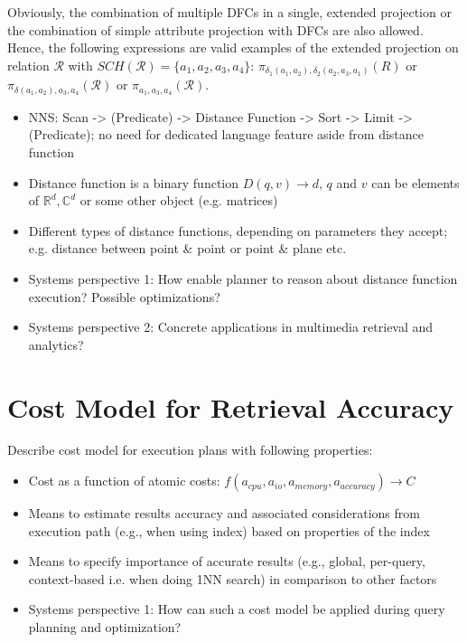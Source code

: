 Obviously, the combination of multiple DFCs in a single, extended projection or the combination of simple attribute projection with DFCs are also allowed. Hence, the following expressions are valid examples of the extended projection on relation $\mathcal{R}$ with $SCH(\mathcal{R}) = \{ a_1, a_2, a_3, a_4 \}$: $\pi_{\delta_1(a_1,a_2), \delta_2(a_2,a_3,a_1)}(R)$ or $\pi_{\delta(a_1,a_2), a_3, a_4}(\mathcal{R})$ or $\pi_{a_1, a_3, a_4}(\mathcal{R})$.


\begin{itemize}
    \item NNS: Scan -> (Predicate) -> Distance Function -> Sort -> Limit -> (Predicate); no need for dedicated language feature aside from distance function
    \item Distance function is a binary function $D(q,v) \longrightarrow d$, $q$ and $v$ can be elements of $\mathbb{R}^d,\mathbb{C}^d$ or some other object (e.g. matrices)
    \item Different types of distance functions, depending on parameters they accept; e.g. distance between point \& point or point \& plane etc.
    \item Systems perspective 1: How enable planner to reason about distance function execution? Possible optimizations?
    \item Systems perspective 2: Concrete applications in multimedia retrieval and analytics?
\end{itemize}

\section{Cost Model for Retrieval Accuracy}
Describe cost model for execution plans with following properties:

\begin{itemize}
    \item Cost as a function of atomic costs: $f(a_{cpu}, a_{io}, a_{memory}, a_{accuracy}) \longrightarrow C$
    \item Means to estimate results accuracy and associated considerations from execution path (e.g., when using index) based on properties of the index
    \item Means to specify importance of accurate results (e.g., global, per-query, context-based i.e. when doing 1NN search) in comparison to other factors
    \item Systems perspective 1: How can such a cost model be applied during query planning and optimization?
\end{itemize}

